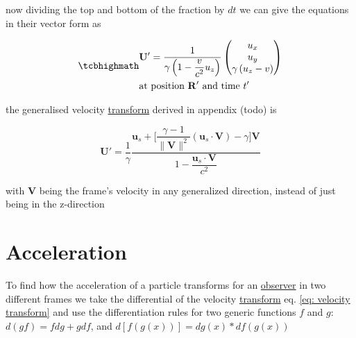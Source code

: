 now dividing the top and bottom of the fraction by $dt$ we can give the equations in their vector form as

\begin{equation}
	\label{eq: velocity transform}
	\mhl{
		\begin{aligned}
			 & \mathbf{U}' = \dfrac{1}{\gamma\left(1- \dfrac{v}{c^2} u_z\right) }
			\begin{pmatrix}
				u_x                             \\
				u_y                             \\
				\gamma \left( u_z  - v  \right) \\
			\end{pmatrix}
			\\
			 & \text{at position $\mathbf{R}'$ and time $t'$ }
		\end{aligned}
	}
\end{equation}

the generalised velocity \hyperlink{def-transform}{transform} derived in appendix (todo) is

\begin{equation}
	\mathbf{U}'  = \dfrac{1}{\gamma} \dfrac{\mathbf{u}_s + \Big[\dfrac{\gamma-1}{\|\mathbf{V}\|^2}(\mathbf{u}_s\cdot \mathbf{V})- \gamma \Big] \mathbf{V}}{1 - \dfrac{\mathbf{u}_s\cdot\mathbf{V}}{c^2}}
\end{equation}

with $\mathbf{V}$ being the frame's velocity in any generalized direction, instead of just being in the z-direction

\section{Acceleration}

To find how the acceleration of a particle transforms for an \hyperlink{def-observer}{observer} in two different frames we take the differential of the velocity \hyperlink{def-transform}{transform} eq. \eqref{eq: velocity transform} and use the differentiation rules for two generic functions $f$ and $g$: $d(gf)=f dg+g df$, and $d[f(g(x))]= dg(x) * df(g(x))$

